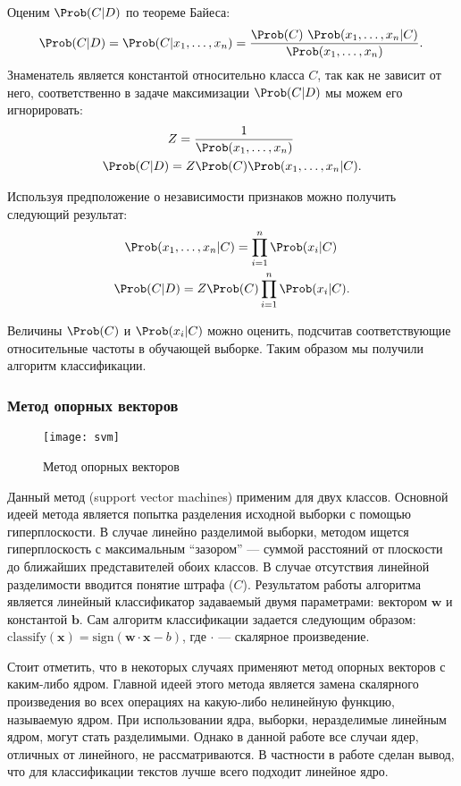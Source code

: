 Оценим $\Prob(C \vert D)$ по теореме Байеса: \begin{gather}
\Prob(C \vert D) = \Prob(C \vert x_1,\dots,x_n) = \frac{\Prob(C) \ \Prob(x_1,\dots,x_n\vert C)}{\Prob(x_1,\dots,x_n)}. \,
\end{gather}
Знаменатель является константой относительно класса $C$, так как не зависит от него, соответственно в задаче максимизации $\Prob(C \vert D)$ мы можем его игнорировать: \begin{gather}
Z = \frac{1}{\Prob(x_1,\dots,x_n)}\, \\
\Prob(C \vert D) = Z \Prob(C) \Prob(x_1,\dots,x_n\vert C).
\end{gather}

Используя предположение о независимости признаков можно получить следующий результат: \begin{gather}
\Prob(x_1,\dots,x_n\vert C) = \prod_{i=1}^n \Prob(x_i \vert C)\, \\
\Prob(C \vert D) = Z \Prob(C) \prod_{i=1}^n \Prob(x_i \vert C).
\end{gather}

Величины $\Prob(C)$ и $\Prob(x_i \vert C)$ можно оценить, подсчитав соответствующие относительные частоты в обучающей выборке. Таким образом мы получили алгоритм классификации.

\subsubsection{Метод опорных векторов}
\begin{figure}[h!]
  \centering
    \texttt{[image: svm]}
    \caption{Метод опорных векторов}
\end{figure}

Данный метод (support vector machines) применим для двух классов. Основной идеей метода является попытка разделения исходной выборки с помощью гиперплоскости. В случае линейно разделимой выборки, методом ищется гиперплоскость с максимальным ``зазором'' --- суммой расстояний от плоскости до ближайших представителей обоих классов. В случае отсутствия линейной разделимости вводится понятие штрафа ($C$).
Результатом работы алгоритма является линейный классификатор задаваемый двумя параметрами: вектором $\mathbf{w}$ и константой $\mathbf{b}$. Сам алгоритм классификации задается следующим образом: $\mathrm{classify}(\mathbf{x}) = \mathrm{sign}(\mathbf{w}\cdot\mathbf{x} - b)$, где $\cdot$ --- скалярное произведение.

Стоит отметить, что в некоторых случаях применяют метод опорных векторов с каким-либо ядром. Главной идеей этого метода является замена скалярного произведения во всех операциях на какую-либо нелинейную функцию, называемую ядром. При использовании ядра, выборки, неразделимые линейным ядром, могут стать разделимыми. Однако в данной работе все случаи ядер, отличных от линейного, не рассматриваются. В частности в работе \cite{Gabrilovich:2004:TCM:1015330.1015388} сделан вывод, что для классификации текстов лучше всего подходит линейное ядро.

